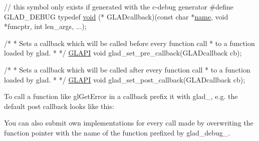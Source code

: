\begin{DoxyCode}
\textcolor{comment}{// this symbol only exists if generated with the c-debug generator}
\textcolor{preprocessor}{#define GLAD\_DEBUG}
\textcolor{keyword}{typedef} \mbox{\hyperlink{glad_8h_aef30cfca5b4a4c292babb2f60f6d3296}{void}} (* GLADcallback)(\textcolor{keyword}{const} \textcolor{keywordtype}{char} *\mbox{\hyperlink{glad_8h_aaced7cfc21e7d37775d6921bb8177239}{name}}, \textcolor{keywordtype}{void} *funcptr, \textcolor{keywordtype}{int} len\_args, ...);

\textcolor{comment}{/*}
\textcolor{comment}{ * Sets a callback which will be called before every function call}
\textcolor{comment}{ * to a function loaded by glad.}
\textcolor{comment}{ *}
\textcolor{comment}{ */}
\mbox{\hyperlink{glad_8h_abad5ea874b73fa802c9ac0f5488bf9b5}{GLAPI}} \textcolor{keywordtype}{void} glad\_set\_pre\_callback(GLADcallback cb);

\textcolor{comment}{/*}
\textcolor{comment}{ * Sets a callback which will be called after every function call}
\textcolor{comment}{ * to a function loaded by glad.}
\textcolor{comment}{ *}
\textcolor{comment}{ */}
\mbox{\hyperlink{glad_8h_abad5ea874b73fa802c9ac0f5488bf9b5}{GLAPI}} \textcolor{keywordtype}{void} glad\_set\_post\_callback(GLADcallback cb);
\end{DoxyCode}


To call a function like {\ttfamily gl\+Get\+Error} in a callback prefix it with {\ttfamily glad\+\_\+}, e.\+g. the default post callback looks like this\+:




You can also submit own implementations for every call made by overwriting the function pointer with the name of the function prefixed by {\ttfamily glad\+\_\+debug\+\_\+}.

